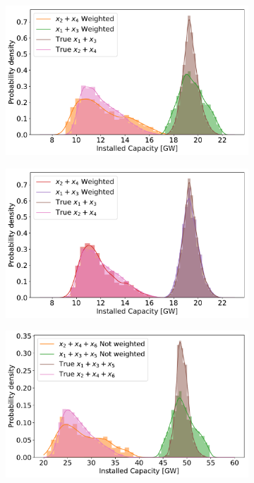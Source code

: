 \begin{figure}[h]\centering
	\begin{subfigure}{.5\textwidth}
		\centering
		\includegraphics[width=1.\textwidth]{./Images/multi_4D_1}
		\caption{}
		\label{fig:multi_4D_1}
	\end{subfigure}%
	\begin{subfigure}{.5\textwidth}
		\centering
		\includegraphics[width=1.\textwidth]{./Images/multi_4D_2}
		\caption{}
		\label{fig:multi_4D_2}
	\end{subfigure}
	\vspace{10pt}
	\begin{subfigure}{.5\textwidth}
		\centering
		\includegraphics[width=1.\textwidth]{./Images/multi_6D_1}

\end{subfigure}
\end{figure}
